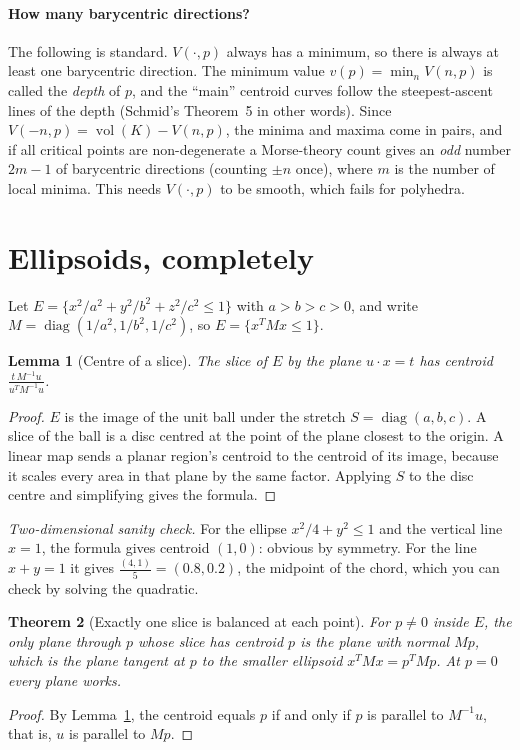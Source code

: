 \documentclass[11pt]{article}
\theoremstyle{plain}
\newtheorem{lemma}{Lemma}[section]
\newtheorem{theorem}[lemma]{Theorem}
\theoremstyle{definition}
\theoremstyle{remark}
\newcommand{\vol}{\operatorname{vol}}
\begin{document}
\paragraph{How many barycentric directions?} The following is standard. $V(\cdot,p)$ always has a minimum, so there is always at least one barycentric direction. The minimum value $v(p)=\min_nV(n,p)$ is called the \emph{depth} of $p$, and the ``main'' centroid curves follow the steepest-ascent lines of the depth (Schmid's Theorem~5 \cite{schmid} in other words). Since $V(-n,p)=\vol(K)-V(n,p)$, the minima and maxima come in pairs, and if all critical points are non-degenerate a Morse-theory count gives an \emph{odd} number $2m-1$ of barycentric directions (counting $\pm n$ once), where $m$ is the number of local minima. This needs $V(\cdot,p)$ to be smooth, which fails for polyhedra.

\section{Ellipsoids, completely}\label{sec:ellipsoid}

Let $E=\{x^2/a^2+y^2/b^2+z^2/c^2\le1\}$ with $a>b>c>0$, and write $M=\operatorname{diag}(1/a^2,1/b^2,1/c^2)$, so $E=\{x^TMx\le1\}$.

\begin{lemma}[Centre of a slice]\label{lem:B1}
The slice of $E$ by the plane $u\cdot x=t$ has centroid $\displaystyle\frac{t\,M^{-1}u}{u^TM^{-1}u}$.
\end{lemma}
\begin{proof}
$E$ is the image of the unit ball under the stretch $S=\operatorname{diag}(a,b,c)$. A slice of the ball is a disc centred at the point of the plane closest to the origin. A linear map sends a planar region's centroid to the centroid of its image, because it scales every area in that plane by the same factor. Applying $S$ to the disc centre and simplifying gives the formula.
\end{proof}

\noindent\emph{Two-dimensional sanity check.} For the ellipse $x^2/4+y^2\le1$ and the vertical line $x=1$, the formula gives centroid $(1,0)$: obvious by symmetry. For the line $x+y=1$ it gives $\frac{(4,1)}{5}=(0.8,0.2)$, the midpoint of the chord, which you can check by solving the quadratic.

\begin{theorem}[Exactly one slice is balanced at each point]\label{thm:B2}
For $p\ne0$ inside $E$, the only plane through $p$ whose slice has centroid $p$ is the plane with normal $Mp$, which is the plane tangent at $p$ to the smaller ellipsoid $x^TMx=p^TMp$. At $p=0$ every plane works.
\end{theorem}
\begin{proof}
By Lemma~\ref{lem:B1}, the centroid equals $p$ if and only if $p$ is parallel to $M^{-1}u$, that is, $u$ is parallel to $Mp$.
\end{proof}
\end{document}
